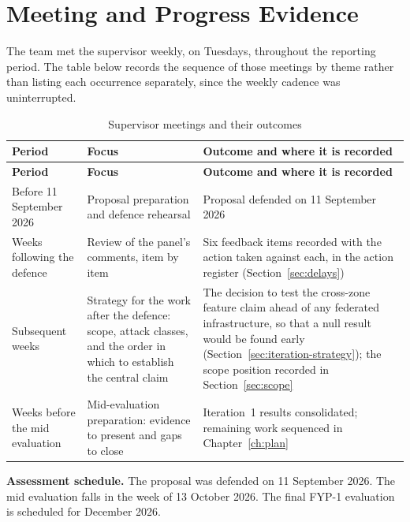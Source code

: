 \chapter{Meeting and Progress Evidence}
The team met the supervisor weekly, on Tuesdays, throughout the reporting period. The
table below records the sequence of those meetings by theme rather than listing each
occurrence separately, since the weekly cadence was uninterrupted.

\begin{longtable}{p{} p{} p{}}
\caption{Supervisor meetings and their outcomes}\label{tab:meetings}\\
\toprule
\textbf{Period} & \textbf{Focus} & \textbf{Outcome and where it is recorded} \\
\midrule
\endfirsthead
\toprule
\textbf{Period} & \textbf{Focus} & \textbf{Outcome and where it is recorded} \\
\midrule
\endhead
Before 11 September 2026 &
Proposal preparation and defence rehearsal &
Proposal defended on 11 September 2026 \\
\addlinespace
Weeks following the defence &
Review of the panel's comments, item by item &
Six feedback items recorded with the action taken against each, in the action
register (Section~\ref{sec:delays}) \\
\addlinespace
Subsequent weeks &
Strategy for the work after the defence: scope, attack classes, and the order in
which to establish the central claim &
The decision to test the cross-zone feature claim ahead of any federated
infrastructure, so that a null result would be found early (Section~\ref{sec:iteration-strategy}); the
scope position recorded in Section~\ref{sec:scope}\\
\addlinespace
Weeks before the mid evaluation &
Mid-evaluation preparation: evidence to present and gaps to close &
Iteration~1 results consolidated; remaining work sequenced in Chapter~\ref{ch:plan} \\
\bottomrule
\end{longtable}

\textbf{Assessment schedule.} The proposal was defended on 11 September 2026. The
mid evaluation falls in the week of 13 October 2026. The final FYP-1 evaluation is
scheduled for December 2026.

